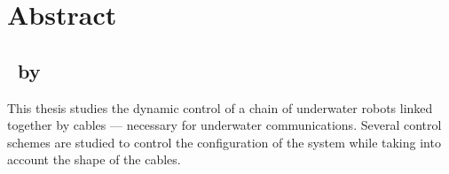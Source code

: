 \chapter{Abstract}

\section*{\thetitle~\textnormal{by \theauthor{}}}

This thesis studies the dynamic control of a chain of underwater robots linked together by cables
--- necessary for underwater communications. Several control schemes are studied to control the
configuration of the system while taking into account the shape of the cables.